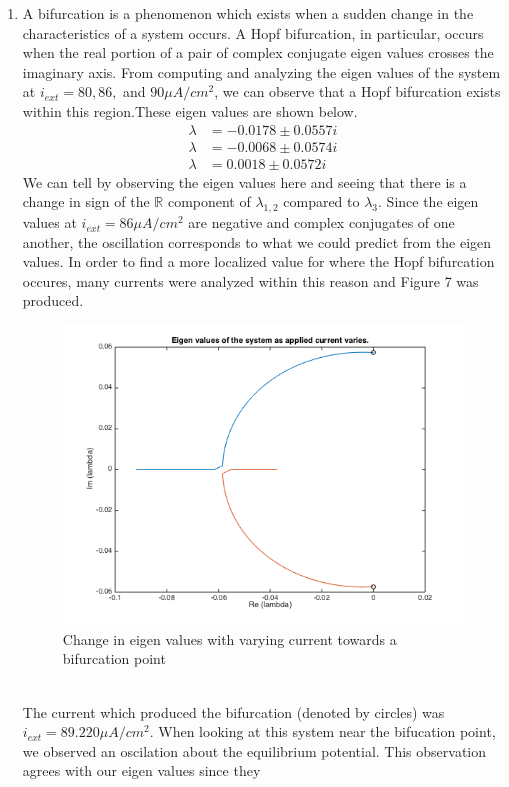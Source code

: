\documentclass[10pt]{report}
\newcommand{\Ree}{\mathbb{R}}
\begin{document}
\begin{enumerate}
\item A bifurcation is a phenomenon which exists when a sudden change in the characteristics of a system occurs. A Hopf bifurcation, in particular, occurs when the real portion of a pair of complex conjugate eigen values crosses the imaginary axis. From computing and analyzing the eigen values of the system at $i_{ext} = 80, 86,$ and $ 90 \mu A/cm^2$, we can observe that a Hopf bifurcation exists within this region.These eigen values are shown below. \begin{align*} \lambda &= -0.0178 \pm 0.0557i \\ \lambda &= -0.0068 \pm 0.0574i \\ \lambda &=  0.0018 \pm 0.0572i \end{align*} We can tell by observing the eigen values here and seeing that there is a change in sign of the $\Ree$ component of $\lambda_{1,2}$ compared to $\lambda_3$. Since the eigen values at $i_{ext} = 86 \mu A/cm^2$ are negative and complex conjugates of one another, the oscillation corresponds to what we could predict from the eigen values. In order to find a more localized value for where the Hopf bifurcation occures, many currents were analyzed within this reason and Figure 7 was produced. \begin{figure}[h!] \includegraphics[scale=0.5]{motnq101.png} \caption[h7]{Change in eigen values with varying current towards a bifurcation point} \end{figure} \\ The current which produced the bifurcation (denoted by circles) was $i_{ext} = 89.220 \mu A/cm^2$. When looking at this system near the bifucation point, we observed an oscilation about the equilibrium potential. This observation agrees with our eigen values since they 
\end{enumerate}
\end{document}
